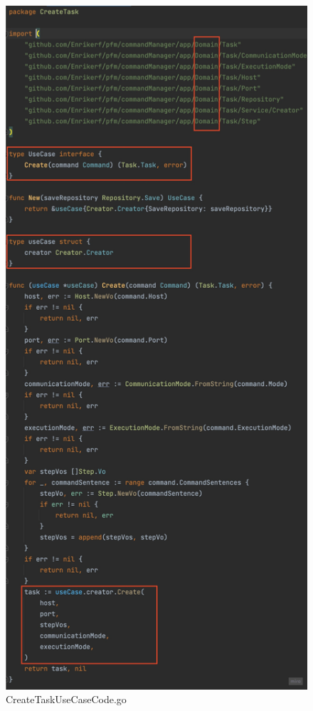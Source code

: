 \begin{figure}[H]
    \centering
    \includegraphics[height=0.5\textheight]{./part/Ejecucion/Seguimiento/CreateTaskUseCase/img/PFM - CreateTaskUseCaseCode}
    \caption{CreateTaskUseCaseCode.go}\label{fig:CreateTaskUseCaseCode}
\end{figure}

